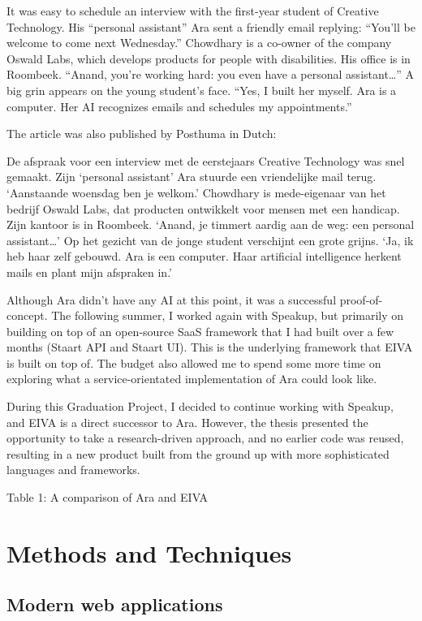 \documentclass{article}
\begin{document}
It was easy to schedule an interview with the first-year student of Creative Technology. His “personal assistant” Ara sent a friendly email replying: “You’ll be welcome to come next Wednesday.” Chowdhary is a co-owner of the company Oswald Labs, which develops products for people with disabilities. His office is in Roombeek. “Anand, you’re working hard: you even have a personal assistant…” A big grin appears on the young student’s face. “Yes, I built her myself. Ara is a computer. Her AI recognizes emails and schedules my appointments.”

The article was also published by Posthuma in Dutch:

De afspraak voor een interview met de eerstejaars Creative Technology was snel gemaakt. Zijn ‘personal assistant’ Ara stuurde een vriendelijke mail terug. ‘Aanstaande woensdag ben je welkom.’ Chowdhary is mede-eigenaar van het bedrijf Oswald Labs, dat producten ontwikkelt voor mensen met een handicap. Zijn kantoor is in Roombeek. ‘Anand, je timmert aardig aan de weg: een personal assistant…’ Op het gezicht van de jonge student verschijnt een grote grijns. ‘Ja, ik heb haar zelf gebouwd. Ara is een computer. Haar artificial intelligence herkent mails en plant mijn afspraken in.’

Although Ara didn’t have any AI at this point, it was a successful proof-of-concept. The following summer, I worked again with Speakup, but primarily on building on top of an open-source SaaS framework that I had built over a few months (Staart API and Staart UI). This is the underlying framework that EIVA is built on top of. The budget also allowed me to spend some more time on exploring what a service-orientated implementation of Ara could look like.

During this Graduation Project, I decided to continue working with Speakup, and EIVA is a direct successor to Ara. However, the thesis presented the opportunity to take a research-driven approach, and no earlier code was reused, resulting in a new product built from the ground up with more sophisticated languages and frameworks.

Table 1: A comparison of Ara and EIVA

\newpage

\section{Methods and Techniques}

\subsection{Modern web applications}
\end{document}
